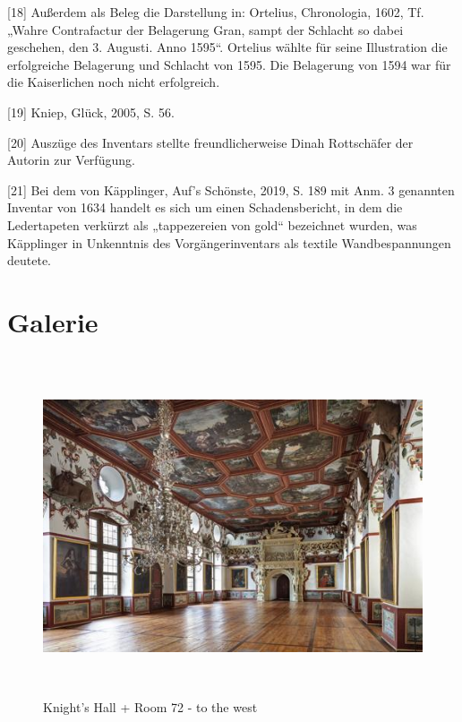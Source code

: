 \documentclass[
  a4paper,
  openany]{book}
\begin{document}
{[}18{]} Außerdem als Beleg die Darstellung in: Ortelius, Chronologia,
1602, Tf. „Wahre Contrafactur der Belagerung Gran, sampt der Schlacht so
dabei geschehen, den 3. Augusti. Anno 1595``. Ortelius wählte für seine
Illustration die erfolgreiche Belagerung und Schlacht von 1595. Die
Belagerung von 1594 war für die Kaiserlichen noch nicht erfolgreich.

{[}19{]} Kniep, Glück, 2005, S. 56.

{[}20{]} Auszüge des Inventars stellte freundlicherweise Dinah
Rottschäfer der Autorin zur Verfügung.

{[}21{]} Bei dem von Käpplinger, Auf's Schönste, 2019, S. 189 mit Anm. 3
genannten Inventar von 1634 handelt es sich um einen Schadensbericht, in
dem die Ledertapeten verkürzt als „tappezereien von gold`` bezeichnet
wurden, was Käpplinger in Unkenntnis des Vorgängerinventars als textile
Wandbespannungen deutete.


\chapter{Galerie}\label{galerie}

\begin{figure}[H]
\centering
\includegraphics[height=10cm]{./images/fmd10005862a.jpg}
\caption{Knight's Hall + Room 72 - to the west}
\label{fig:{https://previous.bildindex.de/bilder/fmd10005862a.jpg}}
\end{figure}

\clearpage
\end{document}
